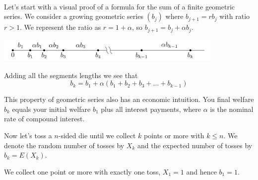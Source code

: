 \documentclass{article}
\theoremstyle{plain}
\begin{document}
\begin{filler}
[white]
\\


\noindent Let's start with a visual proof of a formula for the sum of a  finite geometric series.
We consider a growing geometric series $(b_j)$ where $b_{j + 1} = r b_j$ with ratio $r > 1$.
We represent the ratio as $r = 1 + \alpha$, so $b_{j + 1} = b_j + \alpha b_j$.

\includegraphics[width=11cm]{geometric_series.png}




		

Adding all the segments lengths we see that
\[
b_{k} = b_1 + \alpha (b_1 + b_2 + b_3 + \ldots + b_{k-1})
\]

This property of geometric series also has an economic intuition. 
You final welfare $b_k$ equals your initial welfare $b_1$ plus all interest payments,
where $\alpha$ is the nominal rate of compound interest.


Now let's toss a $n$-sided die until we collect $k$ points or more with $k\leq n$.
We denote the random number of tosses by $X_k$ and the expected number of tosses 
by $b_k = E(X_k)$. 

We collect one point or more with exactly one toss, $X_1 = 1$ and hence $b_1 = 1$. 


\end{filler}
\end{document}
